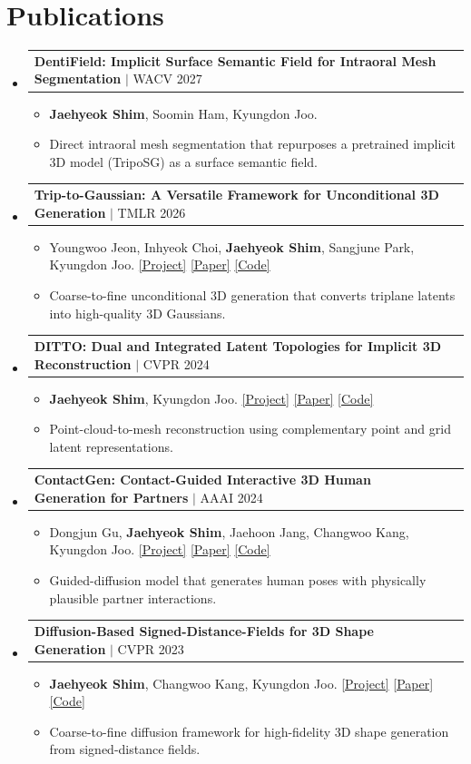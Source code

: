 \documentclass[letterpaper,11pt]{article}
\makeatletter
\newcommand{\resumeItem}[1]{
  \item\small{{#1 \vspace{-2pt}}
  }
}
\newcommand{\resumeProjectHeading}[2]{
    \item
    \begin{tabular*}{0.97\textwidth}{l@{\extracolsep{\fill}}r}
      \small#1 & #2 \\
    \end{tabular*}\vspace{-7pt}
}
\newcommand{\resumeSubHeadingListStart}{\begin{itemize}[leftmargin=0.15in, label={}]}
\newcommand{\resumeSubHeadingListEnd}{\end{itemize}}
\newcommand{\resumeItemListStart}{\begin{itemize}}
\newcommand{\resumeItemListEnd}{\end{itemize}\vspace{-5pt}}
\makeatother
\begin{document}
\section{Publications}
  \resumeSubHeadingListStart
    \resumeProjectHeading
      {\textbf{DentiField: Implicit Surface Semantic Field for Intraoral Mesh Segmentation} $|$ WACV 2027}{}
      \resumeItemListStart
        \resumeItem{\textbf{Jaehyeok Shim}, Soomin Ham, Kyungdon Joo.}
        \resumeItem{Direct intraoral mesh segmentation that repurposes a pretrained implicit 3D model (TripoSG) as a surface semantic field.}
      \resumeItemListEnd
    \resumeProjectHeading
      {\textbf{Trip-to-Gaussian: A Versatile Framework for Unconditional 3D Generation} $|$ TMLR 2026}{}
      \resumeItemListStart
        \resumeItem{Youngwoo Jeon, Inhyeok Choi, \textbf{Jaehyeok Shim}, Sangjune Park, Kyungdon Joo. \href{https://vision3d-lab.github.io/trip2gs}{[Project]} \href{https://openreview.net/pdf?id=9uL23Jcjvj}{[Paper]} \href{https://github.com/vision3d-lab/trip2gs}{[Code]}}
        \resumeItem{Coarse-to-fine unconditional 3D generation that converts triplane latents into high-quality 3D Gaussians.}
      \resumeItemListEnd
    \resumeProjectHeading
      {\textbf{DITTO: Dual and Integrated Latent Topologies for Implicit 3D Reconstruction} $|$ CVPR 2024}{}
      \resumeItemListStart
        \resumeItem{\textbf{Jaehyeok Shim}, Kyungdon Joo. \href{https://vision3d-lab.github.io/ditto}{[Project]} \href{https://arxiv.org/abs/2403.05005}{[Paper]} \href{https://github.com/vision3d-lab/ditto}{[Code]}}
        \resumeItem{Point-cloud-to-mesh reconstruction using complementary point and grid latent representations.}
      \resumeItemListEnd
    \resumeProjectHeading
      {\textbf{ContactGen: Contact-Guided Interactive 3D Human Generation for Partners} $|$ AAAI 2024}{}
      \resumeItemListStart
        \resumeItem{Dongjun Gu, \textbf{Jaehyeok Shim}, Jaehoon Jang, Changwoo Kang, Kyungdon Joo. \href{https://dongjunku.github.io/contactgen}{[Project]} \href{https://arxiv.org/abs/2401.17212}{[Paper]} \href{https://github.com/dongjunKu/ContactGen}{[Code]}}
        \resumeItem{Guided-diffusion model that generates human poses with physically plausible partner interactions.}
      \resumeItemListEnd
    \resumeProjectHeading
      {\textbf{Diffusion-Based Signed-Distance-Fields for 3D Shape Generation} $|$ CVPR 2023}{}
      \resumeItemListStart
        \resumeItem{\textbf{Jaehyeok Shim}, Changwoo Kang, Kyungdon Joo. \href{https://kitsunetic.github.io/sdf-diffusion}{[Project]} \href{https://openaccess.thecvf.com/content/CVPR2023/html/Shim_Diffusion-Based_Signed-Distance-Fields_for_3D_Shape_Generation_CVPR_2023_paper.html}{[Paper]} \href{https://github.com/Kitsunetic/SDF-Diffusion}{[Code]}}
        \resumeItem{Coarse-to-fine diffusion framework for high-fidelity 3D shape generation from signed-distance fields.}
      \resumeItemListEnd
  \resumeSubHeadingListEnd
\end{document}
